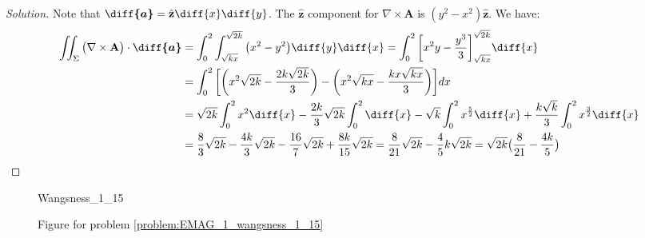 \documentclass[crop=false,class=book,oneside]{standalone}
\begin{document}
\begin{proof}[Solution]
                Note that
                $\boldsymbol{\diff{a}}%
                 =\hat{\mathbf{z}}\diff{x}\diff{y}$.
                The $\hat{\mathbf{z}}$
                component for $\nabla\times\mathbf{A}$ is
                $(y^{2}-x^{2})\hat{\mathbf{z}}$.
                We have:
                \begin{align*}
                    \iint_{\Sigma}\big(\nabla\times\mathbf{A}\big)
                    \cdot\boldsymbol{\diff{a}}
                    &=\int_{0}^{2}\int_{\sqrt{kx}}^{\sqrt{2k}}
                    \big(x^{2}-y^{2}\big)\diff{y}\diff{x}
                    =\int_{0}^{2}\bigg[
                        x^{2}y-\frac{y^{3}}{3}
                    \bigg]_{\sqrt{kx}}^{\sqrt{2k}}\diff{x}\\
                    &=\int_{0}^{2}\bigg[
                        \bigg(
                            x^{2}\sqrt{2k}-\frac{2k\sqrt{2k}}{3}
                        \bigg)
                        -\bigg(
                            x^{2}\sqrt{kx}-\frac{kx\sqrt{kx}}{3}
                        \bigg)
                    \bigg]dx\\
                    &=\sqrt{2k}\int_{0}^{2}x^{2}\diff{x}
                     -\frac{2k}{3}\sqrt{2k}
                    \int_{0}^{2}\diff{x}
                    -\sqrt{k}\int_{0}^{2}x^{\frac{5}{2}}\diff{x}
                    +\frac{k\sqrt{k}}{3}
                     \int_{0}^{2}x^{\frac{3}{2}}\diff{x}\\
                    &=\frac{8}{3}\sqrt{2k}
                     -\frac{4k}{3}\sqrt{2k}-\frac{16}{7}\sqrt{2k}
                     +\frac{8k}{15}\sqrt{2k}
                     =\frac{8}{21}\sqrt{2k}-\frac{4}{5}k\sqrt{2k}
                     =\sqrt{2k}\big(\frac{8}{21}-\frac{4k}{5}\big)
                \end{align*}
            \end{proof}
            \begin{figure}[H]
                \centering
                \captionsetup{type=figure}
                {Wangsness_1_15}
                \caption[Figure for Wangsness 1-15]
                {Figure for problem \ref{problem:EMAG_1_wangsness_1_15}}
                \label{fig:EMAG_1_wangsness_1_15}
            \end{figure}
\end{document}
